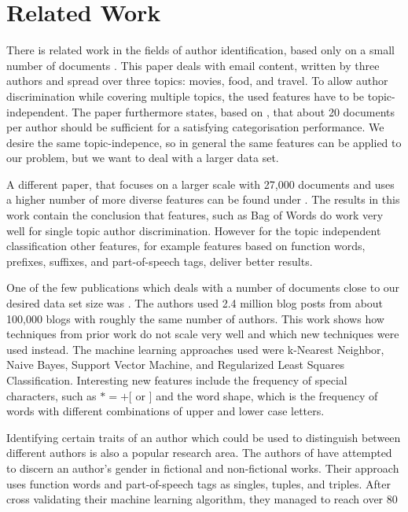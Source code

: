 
\section{Related Work}
\label{sec:related}
There is related work in the fields of author identification, based only on a small number of documents \cite{de2001mining}.
This paper deals with email content, written by three authors and spread over three topics: movies, food, and travel.
To allow author discrimination while covering multiple topics, the used features have to be topic-independent.
The paper furthermore states, based on \cite{corney2001identifying}, that about 20 documents per author should be sufficient for a satisfying categorisation performance.
We desire the same topic-indepence, so in general the same features can be applied to our problem, but we want to deal with a larger data set.


A different paper, that focuses on a larger scale with 27,000 documents and uses a higher number of more diverse features can be found under \cite{madigan2005author}.
The results in this work contain the conclusion that features, such as Bag of Words do work very well for single topic author discrimination.
However for the topic independent classification other features, for example features based on function words, prefixes, suffixes, and part-of-speech tags, deliver better results.


One of the few publications which deals with a number of documents close to our desired data set size was \cite{narayanan2012feasibility}.
The authors used 2.4 million blog posts from about 100,000 blogs with roughly the same number of authors.
This work shows how techniques from prior work do not scale very well and which new techniques were used instead.
The machine learning approaches used were k-Nearest Neighbor, Naive Bayes, Support Vector Machine, and Regularized Least Squares Classification.
Interesting new features include the frequency of special characters, such as $*=+[$ or $]$ and the word shape, which is the frequency of words with different combinations of upper and lower case letters. 


Identifying certain traits of an author which could be used to distinguish between different authors is also a popular research area.
The authors of \cite{koppel2003automatically} have attempted to discern an author's gender in fictional and non-fictional works.
Their approach uses function words and part-of-speech tags as singles, tuples, and triples.
After cross validating their machine learning algorithm, they managed to reach over 80%